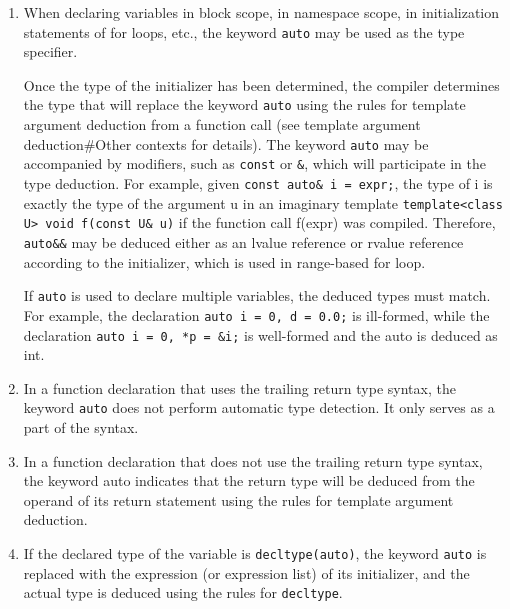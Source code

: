 \begin{enumerate}
	\item When declaring variables in block scope, in namespace scope, in initialization statements of for loops, etc., the keyword \lstinline[style=CppStyleInline]|auto| may be used as the type specifier.
	
	Once the type of the initializer has been determined, the compiler determines the type that will replace the keyword \lstinline[style=CppStyleInline]|auto| using the rules for template argument deduction from a function call (see template argument deduction\#Other contexts for details). The keyword \lstinline[style=CppStyleInline]|auto| may be accompanied by modifiers, such as \lstinline[style=CppStyleInline]|const| or \lstinline[style=CppStyleInline]|&|, which will participate in the type deduction. For example, given \lstinline[style=CppStyleInline]|const auto& i = expr;|, the type of i is exactly the type of the argument u in an imaginary template \lstinline[style=CppStyleInline]|template<class U> void f(const U& u)| if the function call f(expr) was compiled. Therefore, \lstinline[style=CppStyleInline]|auto&&| may be deduced either as an lvalue reference or rvalue reference according to the initializer, which is used in range-based for loop.
	
	If \lstinline[style=CppStyleInline]|auto| is used to declare multiple variables, the deduced types must match. For example, the declaration \lstinline[style=CppStyleInline]|auto i = 0, d = 0.0;| is ill-formed, while the declaration \lstinline[style=CppStyleInline]|auto i = 0, *p = &i;| is well-formed and the auto is deduced as int.
	
	\item In a function declaration that uses the trailing return type syntax, the keyword \lstinline[style=CppStyleInline]|auto| does not perform automatic type detection. It only serves as a part of the syntax.
	
	\item In a function declaration that does not use the trailing return type syntax, the keyword auto indicates that the return type will be deduced from the operand of its return statement using the rules for template argument deduction.
	
	\item If the declared type of the variable is \lstinline[style=CppStyleInline]|decltype(auto)|, the keyword \lstinline[style=CppStyleInline]|auto| is replaced with the expression (or expression list) of its initializer, and the actual type is deduced using the rules for \lstinline[style=CppStyleInline]|decltype|.
	

\end{enumerate}
